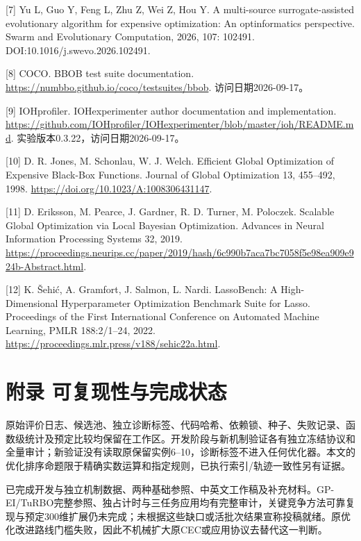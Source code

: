 \documentclass[11pt,a4paper]{article}
\begin{document}
{[}7{]} Yu L, Guo Y, Feng L, Zhu Z, Wei Z, Hou Y. A multi-source
surrogate-assisted evolutionary algorithm for expensive optimization: An
optinformatics perspective. Swarm and Evolutionary Computation, 2026,
107: 102491. DOI:10.1016/j.swevo.2026.102491.

{[}8{]} COCO. BBOB test suite documentation.
\url{https://numbbo.github.io/coco/testsuites/bbob}.
访问日期2026-09-17。

{[}9{]} IOHprofiler. IOHexperimenter author documentation and
implementation.
\url{https://github.com/IOHprofiler/IOHexperimenter/blob/master/ioh/README.md}.
实验版本0.3.22，访问日期2026-09-17。

{[}10{]} D. R. Jones, M. Schonlau, W. J. Welch. Efficient Global
Optimization of Expensive Black-Box Functions. Journal of Global
Optimization 13, 455--492, 1998.
\url{https://doi.org/10.1023/A:1008306431147}.

{[}11{]} D. Eriksson, M. Pearce, J. Gardner, R. D. Turner, M. Poloczek.
Scalable Global Optimization via Local Bayesian Optimization. Advances
in Neural Information Processing Systems 32, 2019.
\url{https://proceedings.neurips.cc/paper/2019/hash/6c990b7aca7bc7058f5e98ea909e924b-Abstract.html}.

{[}12{]} K. Šehić, A. Gramfort, J. Salmon, L. Nardi. LassoBench: A
High-Dimensional Hyperparameter Optimization Benchmark Suite for Lasso.
Proceedings of the First International Conference on Automated Machine
Learning, PMLR 188:2/1--24, 2022.
\url{https://proceedings.mlr.press/v188/sehic22a.html}.

\hypertarget{ux9644ux5f55-ux53efux590dux73b0ux6027ux4e0eux5b8cux6210ux72b6ux6001}{%
\section{附录
可复现性与完成状态}\label{ux9644ux5f55-ux53efux590dux73b0ux6027ux4e0eux5b8cux6210ux72b6ux6001}}

原始评价日志、候选池、独立诊断标签、代码哈希、依赖锁、种子、失败记录、函数级统计及预定比较均保留在工作区。开发阶段与新机制验证各有独立冻结协议和全量审计；新验证没有读取原保留实例6--10，诊断标签不进入任何优化器。本文的优化排序命题限于精确实数运算和指定规则，已执行索引/轨迹一致性另有证据。

已完成开发与独立机制数据、两种基础参照、中英文工作稿及补充材料。GP-EI/TuRBO完整参照、独占计时与三任务应用均有完整审计，关键竞争方法可靠复现与预定300维扩展仍未完成；未根据这些缺口或活批次结果宣称投稿就绪。原优化改进路线门槛失败，因此不机械扩大原CEC或应用协议去替代这一判断。
\end{document}
